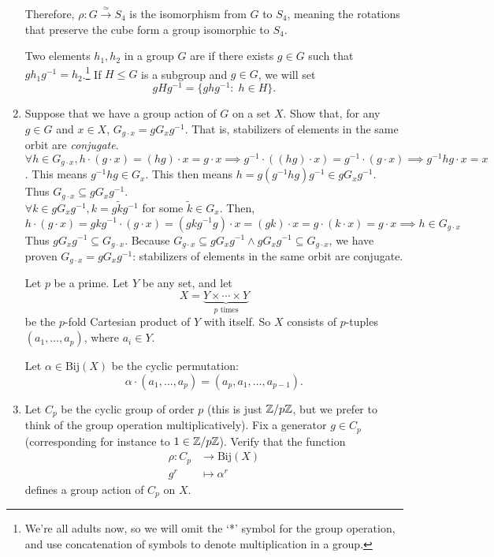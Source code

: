 \documentclass{amsart}
\begin{document}
\begin{enumerate}[itemsep=0.4in]
Therefore, $\rho:G\xrightarrow{\simeq}S_4$ is the isomorphism from $G$ to $S_4$, meaning the rotations that preserve the cube form a group isomorphic to $S_4$.


\vspace{0.2in}

Two elements $h_1,h_2$ in a group $G$ are  if there exists $g\in G$ such that $gh_1g^{-1} = h_2$.\footnote{We're all adults now, so we will omit the `*' symbol for the group operation, and use concatenation of symbols to denote multiplication in a group.} If $H\leq G$ is a subgroup and $g\in G$, we will set
\[
gHg^{-1} = \{ghg^{-1}:\;h\in H\}.
\]

\item Suppose that we have a group action of $G$ on a set $X$. Show that, for any $g\in G$ and $x\in X$, $G_{g\cdot x} = gG_xg^{-1}$. That is, stabilizers of elements in the same orbit are \emph{conjugate}.\\

$\forall h\in G_{g\cdot x},h\cdot(g\cdot x)=(hg)\cdot x=g\cdot x\implies g^{-1}\cdot((hg)\cdot x)=g^{-1}\cdot(g\cdot x)\implies g^{-1}hg\cdot x=x$. This means $g^{-1}hg\in G_x$. This then means $h=g(g^{-1}hg)g^{-1}\in gG_xg^{-1}$.
Thus $G_{g\cdot x}\subseteq gG_xg^{-1}$.\\

$\forall k\in gG_xg^{-1},k=g\tilde kg^{-1}$ for some $\tilde k\in G_x$. Then, $$h\cdot(g\cdot x)=gkg^{-1}\cdot(g\cdot x)=(gkg^{-1}g)\cdot x=(gk)\cdot x=g\cdot(k\cdot x)=g\cdot x\implies h\in G_{g\cdot x}$$
Thus $gG_xg^{-1}\subseteq G_{g\cdot x}$. Because $G_{g\cdot x}\subseteq gG_xg^{-1}\land gG_xg^{-1}\subseteq G_{g\cdot x}$, we have proven $G_{g\cdot x}= gG_xg^{-1}$: stabilizers of elements in the same orbit are conjugate.


\vspace{0.2in}

Let $p$ be a prime. Let $Y$ be any set, and let
\[
X = \underbrace{Y\times \cdots \times Y}_\text{$p$ times}
\]
be the $p$-fold Cartesian product of $Y$ with itself. So $X$ consists of $p$-tuples $(a_1,\ldots,a_p)$, where $a_i\in Y$. 

Let $\alpha\in \mathrm{Bij}(X)$ be the cyclic permutation:
\[
\alpha\cdot (a_1,\ldots,a_p) = (a_p,a_1,\ldots,a_{p-1}).
\]

 \item Let $C_p$ be the cyclic group of order $p$ (this is just $\mathbb{Z}/p\mathbb{Z}$, but we prefer to think of the group operation multiplicatively). Fix a generator $g\in C_p$ (corresponding for instance to $1\in \mathbb{Z}/p\mathbb{Z}$). Verify that the function
 \begin{align*}
\rho:C_p &\to \mathrm{Bij}(X)\\
g^r&\mapsto \alpha^r
 \end{align*}
 defines a group action of $C_p$ on $X$.


\end{enumerate}
\end{document}
